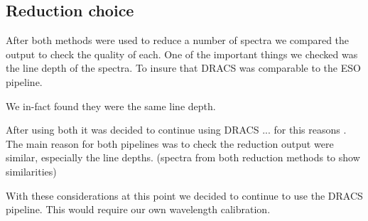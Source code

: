 
\subsection{Reduction choice }

After both methods were used to reduce a number of spectra we compared the output to check the quality of each. One of the important things we checked was the line depth of the spectra. To insure that DRACS was comparable to the ESO pipeline.

We in-fact found they were the same line depth.


After using both it was decided to continue using DRACS ... for this reasons
. 
The main reason for both pipelines was to check the reduction output were similar, especially the line depths.
\missingfigure(spectra from both reduction methods to show similarities)

With these considerations at this point we decided to continue to use the DRACS pipeline. This would require our own wavelength calibration. 



